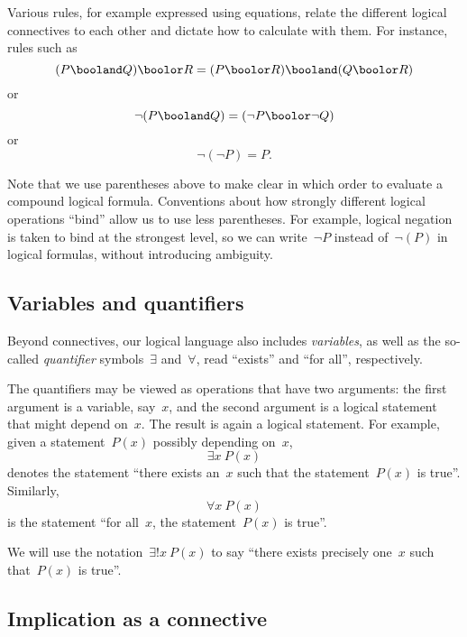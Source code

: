 Various rules, for example expressed using equations, relate the different logical connectives to each other and dictate how to calculate with them.
For instance, rules such as
\begin{equation*}
    (P \booland Q) \boolor R = (P \boolor R) \booland (Q \boolor R)
\end{equation*}
or
\begin{equation*}
    \lnot (P \booland Q)  = (\lnot P \boolor \lnot Q)
\end{equation*}
or
\begin{equation*}
    \lnot (\lnot P) = P.
\end{equation*}

Note that we use parentheses above to make clear in which order to evaluate a compound logical formula.
Conventions about how strongly different logical operations ``bind'' allow us to use less parentheses.
For example, logical negation is taken to bind at the strongest level, so we can write~$\lnot P$ instead of~$\lnot (P)$ in logical formulas, without introducing ambiguity.

\subsection{Variables and quantifiers}

Beyond connectives, our logical language also includes \emph{variables}, as well as the so-called \emph{quantifier} symbols~$\exists$ and~$\forall$, read ``exists'' and ``for all'', respectively.

The quantifiers may be viewed as operations that have two arguments:
the first argument is a variable, say~$x$, and the second argument is a logical statement that might depend on~$x$.
The result is again a logical statement.
For example, given a statement~$P(x)$ possibly depending on~$x$,
\begin{equation*}
    \exists x \ P(x)
\end{equation*}
denotes the statement ``there exists an~$x$ such that the statement~$P(x)$ is true''.
Similarly,
\begin{equation*}
    \forall x \ P(x)
\end{equation*}
is the statement ``for all~$x$, the statement~$P(x)$ is true''.

We will use the notation~$\exists!
    x \ P(x)$ to say ``there exists precisely one~$x$ such that~$P(x)$ is true''.

\subsection{Implication as a connective}

